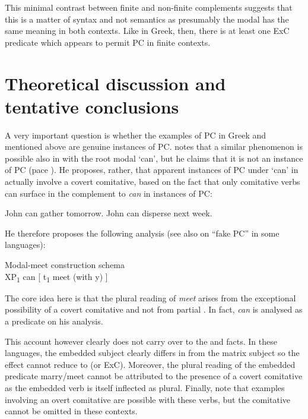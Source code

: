 \documentclass[output=paper]{langsci/langscibook}
\begin{document}
This minimal contrast between finite and non-finite complements suggests that
this is a matter of syntax and not semantics as presumably the modal has the
same meaning in both contexts. Like in Greek, then, there is at least one
\gls{ExC} predicate which appears to permit
\gls{PC} in finite  contexts.

\section{Theoretical discussion and tentative conclusions}\label{sec:key:24.5}

A very important question is whether the examples of
\gls{PC} in Greek and  mentioned above are
genuine instances of PC. \citet{Poole2015} notes that a similar phenomenon is
possible also in  with the root modal ‘can’, but he claims that it is
not an instance of \gls{PC} (pace
\citealt{Rodrigues2007}). He proposes, rather, that apparent instances of
\gls{PC} under ‘can’ in  actually involve a
covert comitative, based on the fact that only comitative verbs can surface in
the complement to \emph{can} in instances of \gls{PC}:

\ea%
    \label{ex:key:24.40} \textcite[14]{Poole2015}
	\ea *John can gather tomorrow.
	\ex *John can disperse next week.
	\z
\z

He therefore proposes the following analysis (see also \citealt{Sheehan2014c} on
\enquote{fake \gls{PC}} in some  languages):

\ea\label{ex:key:24.41} Modal-meet construction schema \parencite[15]{Poole2015}\\%
    XP\textsubscript{1} can [ t\textsubscript{1} meet (with y) ]
\z

The core idea here is that the plural reading of \emph{meet} arises from the
exceptional possibility of a covert comitative and not from partial . In
fact, \emph{can} is analysed as a  predicate on his
analysis.

This account however clearly does not carry over to the  and
 facts. In these languages, the embedded subject clearly differs in 
from the matrix subject so the effect cannot reduce to  (or \gls{ExC}).
Moreover, the plural reading of the embedded predicate marry/meet cannot be
attributed to the presence of a covert comitative as the embedded verb is
itself inflected as plural. Finally, note that examples involving an overt
comitative are possible with these verbs, but the comitative cannot be omitted
in these contexts.
\end{document}
